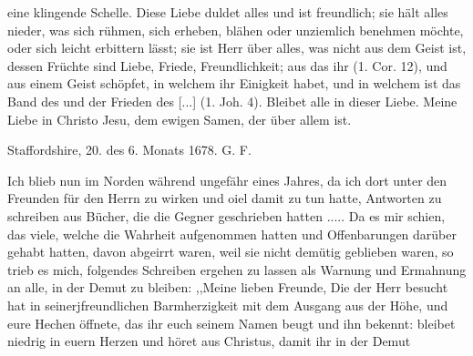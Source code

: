 {    eine klingende Schelle. Diese Liebe duldet alles und ist 
    freundlich; sie hält alles nieder, was sich rühmen, sich erheben,
    blähen oder unziemlich benehmen möchte, oder sich leicht erbittern
    lässt; sie ist Herr über alles, was nicht aus dem Geist ist, dessen
    Früchte sind Liebe, Friede, Freundlichkeit; aus das ihr  (1. Cor. 12),
    und aus einem Geist schöpfet, in welchem ihr Einigkeit habet,
    und in welchem ist das Band des  und
    der Frieden des  [...] 
    (1. Joh. 4). Bleibet alle in 
    dieser Liebe. Meine Liebe in Christo
    Jesu, dem ewigen Samen, der über allem ist.
    \bigskip 

    \begin{flushright}
    Staffordshire, 20. des 6. Monats 1678. G. F.\end{flushright}
}


Ich blieb nun im Norden während ungefähr eines Jahres,
da ich dort unter den Freunden für den Herrn zu wirken
und oiel damit zu tun hatte, Antworten zu schreiben aus Bücher,
die die Gegner geschrieben hatten ..... Da es mir schien, das
viele, welche die Wahrheit aufgenommen hatten und Offenbarungen
darüber gehabt hatten, davon abgeirrt waren, weil sie nicht
demütig geblieben waren, so trieb es mich, folgendes Schreiben
ergehen zu lassen als Warnung und Ermahnung an alle, in der
Demut zu bleiben:
,,Meine lieben Freunde,
Die der Herr besucht hat in seinerjfreundlichen Barmherzigkeit
mit dem Ausgang aus der Höhe, und eure Hechen öffnete, das
ihr euch seinem Namen beugt und ihn bekennt: bleibet niedrig in
euern Herzen und höret aus Christus, damit ihr in der Demut


